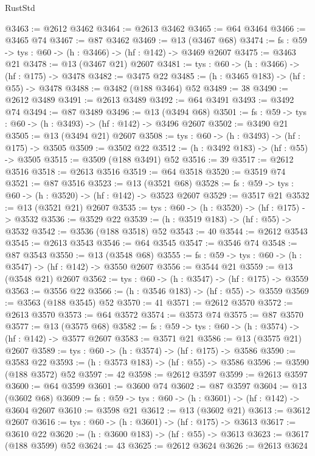 \begin{lexlean}{RustStd}
\begin{coremodule}
@3463 := @2612 @3462
@3464 := @2613 @3462
@3465 := @64 @3464
@3466 := @3465 @74
@3467 := @87 @3462
@3469 := @13 (@3467 @68)
@3474 := {fs : @59} -> {tys : @60} -> (h : @3466) -> (hf : @142) -> @3469 @2607
@3475 := @3463 @21
@3478 := @13 (@3467 @21) @2607
@3481 := {tys : @60} -> (h : @3466) -> (hf : @175) -> @3478
@3482 := @3475 @22
@3485 := (h : @3465 @183) -> (hf : @55) -> @3478
@3488 := @3482 (@188 @3464) @52
@3489 := 38
@3490 := @2612 @3489
@3491 := @2613 @3489
@3492 := @64 @3491
@3493 := @3492 @74
@3494 := @87 @3489
@3496 := @13 (@3494 @68)
@3501 := {fs : @59} -> {tys : @60} -> (h : @3493) -> (hf : @142) -> @3496 @2607
@3502 := @3490 @21
@3505 := @13 (@3494 @21) @2607
@3508 := {tys : @60} -> (h : @3493) -> (hf : @175) -> @3505
@3509 := @3502 @22
@3512 := (h : @3492 @183) -> (hf : @55) -> @3505
@3515 := @3509 (@188 @3491) @52
@3516 := 39
@3517 := @2612 @3516
@3518 := @2613 @3516
@3519 := @64 @3518
@3520 := @3519 @74
@3521 := @87 @3516
@3523 := @13 (@3521 @68)
@3528 := {fs : @59} -> {tys : @60} -> (h : @3520) -> (hf : @142) -> @3523 @2607
@3529 := @3517 @21
@3532 := @13 (@3521 @21) @2607
@3535 := {tys : @60} -> (h : @3520) -> (hf : @175) -> @3532
@3536 := @3529 @22
@3539 := (h : @3519 @183) -> (hf : @55) -> @3532
@3542 := @3536 (@188 @3518) @52
@3543 := 40
@3544 := @2612 @3543
@3545 := @2613 @3543
@3546 := @64 @3545
@3547 := @3546 @74
@3548 := @87 @3543
@3550 := @13 (@3548 @68)
@3555 := {fs : @59} -> {tys : @60} -> (h : @3547) -> (hf : @142) -> @3550 @2607
@3556 := @3544 @21
@3559 := @13 (@3548 @21) @2607
@3562 := {tys : @60} -> (h : @3547) -> (hf : @175) -> @3559
@3563 := @3556 @22
@3566 := (h : @3546 @183) -> (hf : @55) -> @3559
@3569 := @3563 (@188 @3545) @52
@3570 := 41
@3571 := @2612 @3570
@3572 := @2613 @3570
@3573 := @64 @3572
@3574 := @3573 @74
@3575 := @87 @3570
@3577 := @13 (@3575 @68)
@3582 := {fs : @59} -> {tys : @60} -> (h : @3574) -> (hf : @142) -> @3577 @2607
@3583 := @3571 @21
@3586 := @13 (@3575 @21) @2607
@3589 := {tys : @60} -> (h : @3574) -> (hf : @175) -> @3586
@3590 := @3583 @22
@3593 := (h : @3573 @183) -> (hf : @55) -> @3586
@3596 := @3590 (@188 @3572) @52
@3597 := 42
@3598 := @2612 @3597
@3599 := @2613 @3597
@3600 := @64 @3599
@3601 := @3600 @74
@3602 := @87 @3597
@3604 := @13 (@3602 @68)
@3609 := {fs : @59} -> {tys : @60} -> (h : @3601) -> (hf : @142) -> @3604 @2607
@3610 := @3598 @21
@3612 := @13 (@3602 @21)
@3613 := @3612 @2607
@3616 := {tys : @60} -> (h : @3601) -> (hf : @175) -> @3613
@3617 := @3610 @22
@3620 := (h : @3600 @183) -> (hf : @55) -> @3613
@3623 := @3617 (@188 @3599) @52
@3624 := 43
@3625 := @2612 @3624
@3626 := @2613 @3624

\end{coremodule}
\end{lexlean}
